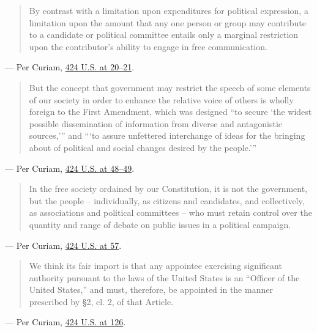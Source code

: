 \documentclass[12pt]{article}
\begin{document}
\begin{quote}
By contrast with a limitation upon expenditures for political expression, a limitation upon the amount that any one person or group may contribute to a candidate or political committee entails only a marginal restriction upon the contributor's ability to engage in free communication.
\end{quote}
\noindent --- Per Curiam, \href{https://supreme.justia.com/cases/federal/us/424/1/}{424 U.S. at 20--21}.

\begin{quote}
But the concept that government may restrict the speech of some elements of our society in order to enhance the relative voice of others is wholly foreign to the First Amendment, which was designed ``to secure `the widest possible dissemination of information from diverse and antagonistic sources,''' and ```to assure unfettered interchange of ideas for the bringing about of political and social changes desired by the people.'''
\end{quote}
\noindent --- Per Curiam, \href{https://supreme.justia.com/cases/federal/us/424/1/}{424 U.S. at 48--49}.

\begin{quote}
In the free society ordained by our Constitution, it is not the government, but the people -- individually, as citizens and candidates, and collectively, as associations and political committees -- who must retain control over the quantity and range of debate on public issues in a political campaign.
\end{quote}
\noindent --- Per Curiam, \href{https://supreme.justia.com/cases/federal/us/424/1/}{424 U.S. at 57}.

\begin{quote}
We think its fair import is that any appointee exercising significant authority pursuant to the laws of the United States is an ``Officer of the United States,'' and must, therefore, be appointed in the manner prescribed by \S 2, cl. 2, of that Article.
\end{quote}
\noindent --- Per Curiam, \href{https://supreme.justia.com/cases/federal/us/424/1/}{424 U.S. at 126}.
\end{document}
